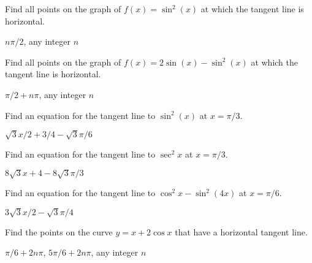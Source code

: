 \begin{exercises}
\begin{exercise} Find all points on the graph of
$f(x)=\sin^2(x)$ at which the tangent line is horizontal.
\begin{answer} $n\pi/2$, any integer $n$
\end{answer}\end{exercise}

\begin{exercise} Find all points on the graph of $f(x) = 2\sin(x) -
\sin^2(x)$ at which the tangent line is horizontal.
\begin{answer} $\pi/2+n\pi$, any integer $n$
\end{answer}\end{exercise}

\begin{exercise} Find an
 equation for the tangent line to $\sin^2(x)$ at 
$x=\pi/3$.
\begin{answer} $\sqrt3x/2+3/4-\sqrt3\pi/6$
\end{answer}\end{exercise}

\begin{exercise} Find an equation for the tangent line to $\sec ^2 x$
at $x=\pi/3$.
\begin{answer} $8\sqrt3x+4-8\sqrt3\pi/3$
\end{answer}\end{exercise}

\begin{exercise} Find an equation for the tangent line to $\cos ^2 x -
\sin ^2 (4x)$ at $x=\pi/6$.
\begin{answer} $3\sqrt3x/2-\sqrt3\pi/4$
\end{answer}\end{exercise}

\begin{exercise} Find the points on the curve $y= x+ 2\cos x$ that have a
horizontal tangent line.
\begin{answer} $\pi/6+2n\pi$, $5\pi/6+2n\pi$, any integer $n$
\end{answer}\end{exercise}

\end{exercises}











